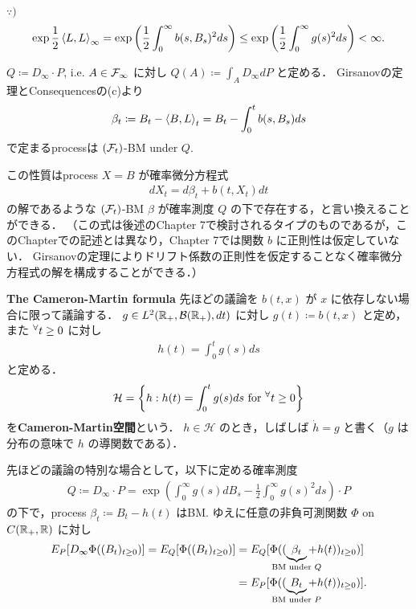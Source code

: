\documentclass{jsarticle}
\begin{document}
\begin{screen}
    $\because)$
    \begin{align}
        \exp\frac{1}{2}\left\langle L,L\right\rangle_\infty
        = \exp\left(\frac{1}{2}\int_0^\infty b(s,B_s)^2 ds\right)
        \le \exp\left(\frac{1}{2}\int_0^\infty g(s)^2 ds\right)
        < \infty.
    \end{align}
\end{screen}

$Q\coloneqq D_\infty\cdot P$, i.e. $A\in\mathcal{F}_\infty$ に対し $Q(A)\coloneqq\int_A D_\infty dP$ と定める．
Girsanovの定理とConsequencesの(c)より
\begin{align}
    \beta_t
    \coloneqq B_t-\left\langle B,L\right\rangle_t
    = B_t-\int_0^t b(s,B_s)ds
\end{align}
で定まるprocessは $(\mathcal{F}_t)$-BM under $Q.$

この性質はprocess $X=B$ が確率微分方程式
\begin{align}
    dX_t=d\beta_t+b(t,X_t)dt
\end{align}
の解であるような $(\mathcal{F}_t)$-BM $\beta$ が確率測度 $Q$ の下で存在する，と言い換えることができる．
（この式は後述のChapter 7で検討されるタイプのものであるが，このChapterでの記述とは異なり，Chapter 7では関数 $b$ に正則性は仮定していない．
Girsanovの定理によりドリフト係数の正則性を仮定することなく確率微分方程式の解を構成することができる．）

\textbf{The Cameron-Martin formula}
先ほどの議論を $b(t,x)$ が $x$ に依存しない場合に限って議論する．
$g\in L^2(\mathbb{R}_+,\mathcal{B}(\mathbb{R}_+),dt)$ に対し $g(t)\coloneqq b(t,x)$ と定め，また ${}^{\forall} t\ge0$ に対し
\begin{align}
    h(t)=\int_{0}^{t}g(s)ds
\end{align}
と定める．
\begin{align}
    \mathcal{H}
    = \left\{h:h(t)=\int_{0}^{t}g(s)ds\text{ for }{}^{\forall} t\ge0\right\}
\end{align}
を\textbf{Cameron-Martin空間}という．
$h\in\mathcal{H}$ のとき，しばしば $\dot{h}=g$ と書く（$g$ は分布の意味で $h$ の導関数である）．

先ほどの議論の特別な場合として，以下に定める確率測度
\begin{align}
    Q
    \coloneqq D_\infty\cdot P
    = \exp\left(\int_0^\infty g(s)dB_s-\frac{1}{2}\int_0^\infty g(s)^2 ds\right)\cdot P
\end{align}
の下で，process $\beta_t\coloneqq B_t-h(t)$ はBM.
ゆえに任意の非負可測関数 $\Phi$ on $C(\mathbb{R}_+,\mathbb{R})$ に対し
\begin{align}
    E_P[D_\infty\Phi((B_t)_{t\ge0})]
    = E_Q[\Phi((B_t)_{t\ge0})]
    &= E_Q[\Phi((\UB{\beta_t}{\text{BM under }Q}+h(t))_{t\ge0})] \\
    &= E_P[\Phi((\UB{B_t}{\text{BM under }P}+h(t))_{t\ge0})].
\end{align}
\end{document}
